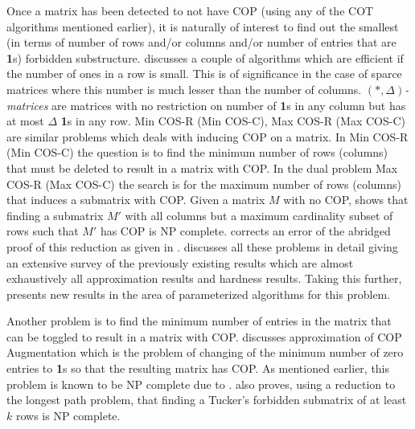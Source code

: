 \documentclass[MS,synopsis]{iitmdiss}
\def \un {\bf 1}
\begin{document}
Once a matrix has been detected to not have COP (using any of the COT
algorithms mentioned earlier), it is naturally of interest to find out
the smallest (in terms of number of rows and/or columns and/or number
of entries that are {\un}s) forbidden substructure. \cite{d08phd}
discusses a couple of algorithms which are efficient if the number of
ones in a row is small. This is of significance in the case of sparce
matrices where this number is much lesser than the number of
columns. $(*,\Delta)${\em -matrices} are matrices with no restriction
on number of {\un}s in any column but has at most $\Delta$ {\un}s in
any row. {\sc Min COS-R (Min COS-C), Max COS-R (Max COS-C)} are
similar problems which deals with inducing COP on a matrix. In {\sc
  Min COS-R (Min COS-C)} the question is to find the minimum number of
rows (columns) that must be deleted to result in a matrix with COP.
In the dual problem {\sc Max COS-R (Max COS-C)} the search is for the
maximum number of rows (columns) that induces a submatrix with
COP. Given a matrix $M$ with no COP, \cite{b75-phd} shows that finding
a submatrix $M'$ with all columns but a maximum cardinality subset
of rows such that $M'$ has COP is NP complete. \cite{hg02} corrects an
error of the abridged proof of this reduction as given in \cite{gj79}.
\cite{d08phd} discusses all these problems in detail giving an
extensive survey of the previously existing results which are almost
exhaustively all approximation results and hardness results. Taking
this further, \cite{d08phd} presents new results in the area of
parameterized algorithms for this problem.

Another problem is to find the minimum number of entries in the matrix
that can be toggled to result in a matrix with COP.  \cite{v85}
discusses approximation of {\sc COP Augmentation} which is the problem
of changing of the minimum number of zero entries to {\un}s so that the
resulting matrix has COP. As mentioned earlier, this problem is
known to be NP complete due to \cite{b75-phd}. \cite{v85} also proves,
using a reduction to the longest path problem,  that finding a Tucker's forbidden
submatrix of at least $k$ rows is NP complete.   
\end{document}

